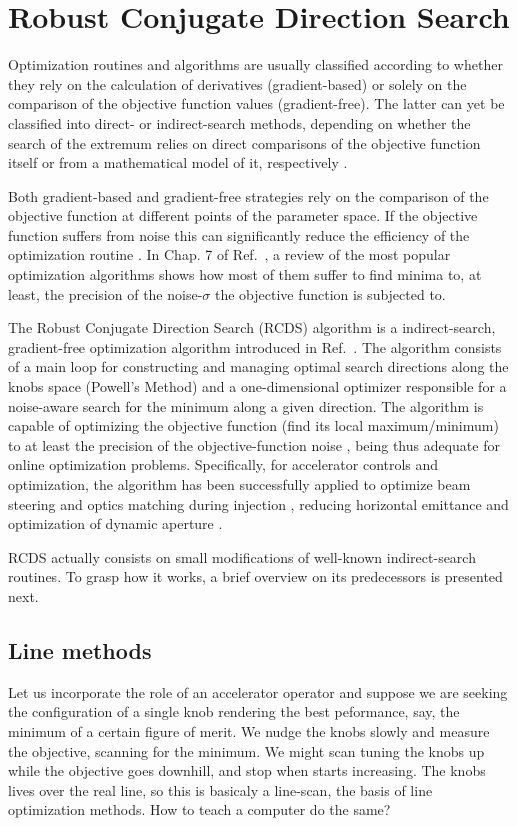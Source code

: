 \section{Robust Conjugate Direction Search}
Optimization routines and algorithms are usually classified according to whether they rely on the calculation of derivatives (gradient-based) or solely on the comparison of the objective function values (gradient-free). The latter can yet be classified into direct- or indirect-search methods, depending on whether the search of the extremum relies on direct comparisons of the objective function itself or from a mathematical model of it, respectively \cite{numerical_recipes}.

Both gradient-based and gradient-free strategies rely on the comparison of the objective function at different points of the parameter space. If the objective function suffers from noise this can significantly reduce the efficiency of the optimization routine \cite{numerical_recipes, huang2019beam}. In Chap. 7 of Ref.~\cite{huang2019beam}, a review of the most popular optimization algorithms shows how most of them suffer to find minima to, at least, the precision of the noise-$\sigma$ the objective function is subjected to.

The Robust Conjugate Direction Search (RCDS) algorithm is a indirect-search, gradient-free optimization algorithm introduced in Ref.~\cite{Huang:2013}. The algorithm consists of a main loop for constructing and managing optimal search directions along the knobs space (Powell's Method) and a one-dimensional optimizer responsible for a noise-aware search for the minimum along a given direction. The algorithm is capable of optimizing the objective function (find its local maximum/minimum) to at least the precision of the objective-function noise \cite{Huang:2013, huang2019beam}, being thus adequate for online optimization problems. Specifically, for accelerator controls and optimization, the algorithm has been successfully applied to optimize beam steering and optics matching during injection \cite{Huang:2013}, reducing horizontal emittance \cite{Huang:2013, Huang:2015}and optimization of dynamic aperture \cite{Huang:2013,Huang:2015,Liuzzo:IPAC2016-THPMR015,Olsson:IPAC2018-WEPAL047,yang:ipac2022-tupopt064}.

RCDS actually consists on small modifications of well-known indirect-search routines. To grasp how it works, a brief overview on its predecessors is presented next.

\subsection{Line methods}
Let us incorporate the role of an accelerator operator and suppose we are seeking the configuration of a single knob rendering the best peformance, say, the minimum of a certain figure of merit. We nudge the knobs slowly and measure the objective, scanning for the minimum. We might scan tuning the knobs up while the objective goes downhill, and stop when starts increasing. The knobs lives over the real line, so this is basicaly a line-scan, the basis of line optimization methods. How to teach a computer do the same?

